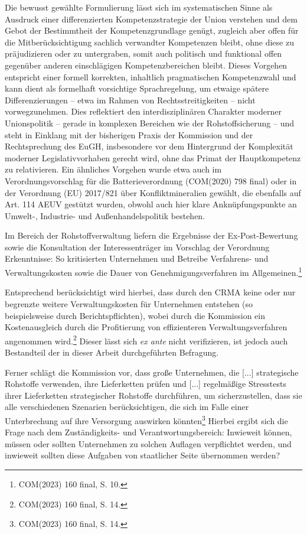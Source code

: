 \documentclass[12pt,a4paper,oneside]{book} %
\begin{document}
	Die bewusst gewählte Formulierung lässt sich im systematischen Sinne als Ausdruck einer differenzierten Kompetenzstrategie der Union verstehen und dem Gebot der Bestimmtheit der Kompetenzgrundlage genügt, zugleich aber offen für die Mitberücksichtigung sachlich verwandter Kompetenzen bleibt, ohne diese zu präjudizieren oder zu untergraben, somit auch politisch und funktional offen gegenüber anderen einschlägigen Kompetenzbereichen bleibt. Dieses Vorgehen entspricht einer formell korrekten, inhaltlich pragmatischen Kompetenzwahl und kann dient  als formelhaft vorsichtige Sprachregelung, um etwaige spätere Differenzierungen – etwa im Rahmen von Rechtsstreitigkeiten – nicht vorwegzunehmen. Dies reflektiert den interdisziplinären Charakter moderner Unionspolitik – gerade in komplexen Bereichen wie der Rohstoffsicherung – und steht in Einklang mit der bisherigen Praxis der Kommission und der Rechtsprechung des EuGH, insbesondere vor dem Hintergrund der Komplexität moderner Legislativvorhaben gerecht wird, ohne das Primat der Hauptkompetenz zu relativieren. Ein ähnliches Vorgehen wurde etwa auch im Verordnungsvorschlag für die Batterieverordnung (COM(2020) 798 final) oder in der Verordnung (EU) 2017/821 über Konfliktmineralien gewählt, die ebenfalls auf Art. 114 AEUV gestützt wurden, obwohl auch hier klare Anknüpfungspunkte an Umwelt-, Industrie- und Außenhandelspolitik bestehen.
	
	Im Bereich der Rohstoffverwaltung liefern die Ergebnisse der Ex-Post-Bewertung sowie die Konsultation der Interessenträger im Vorschlag der Verordnung Erkenntnisse: So kritisierten Unternehmen und Betreibe Verfahrens- und Verwaltungskosten sowie die Dauer von Genehmigungsverfahren im Allgemeinen.\footnote{COM(2023) 160 final, S. 10.}
	
	Entsprechend berücksichtigt wird hierbei, dass durch den CRMA keine oder nur begrenzte weitere Verwaltungskosten für Unternehmen entstehen (so beispielsweise durch Berichtspflichten), wobei durch die Kommission ein Kostenausgleich durch die Profitierung von effizienteren Verwaltungsverfahren angenommen wird.\footnote{COM(2023) 160 final, S. 14.} Dieser lässt sich \textit{ex ante} nicht verifizieren, ist jedoch auch Bestandteil der in dieser Arbeit durchgeführten Befragung. %
	
	Ferner schlägt die Kommission vor, dass \glqq große Unternehmen, die [...] strategische Rohstoffe verwenden, ihre Lieferketten prüfen und [...] regelmäßige Stresstests ihrer Lieferketten strategischer Rohstoffe durchführen, um sicherzustellen, dass sie alle verschiedenen Szenarien berücksichtigen, die sich im Falle einer Unterbrechung auf ihre Versorgung auswirken könnten\grqq \footnote{COM(2023) 160 final, S. 14.} Hierbei ergibt sich die Frage nach dem Zuständigkeits- und Verantwortungsbereich: Inwieweit können, müssen oder sollten Unternehmen zu solchen Auflagen verpflichtet werden, und inwieweit sollten diese Aufgaben von staatlicher Seite übernommen werden?
	
\end{document}
